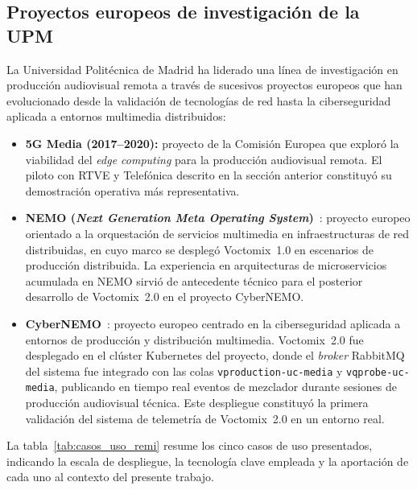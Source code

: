\subsection{Proyectos europeos de investigación de la UPM}

La Universidad Politécnica de Madrid ha liderado una línea de investigación en
producción audiovisual remota a través de sucesivos proyectos europeos que han
evolucionado desde la validación de tecnologías de red hasta la ciberseguridad
aplicada a entornos multimedia distribuidos:

\begin{itemize}
  \item \textbf{5G Media (2017--2020):} proyecto de la Comisión Europea que exploró
        la viabilidad del \textit{edge computing} para la producción audiovisual
        remota. El piloto con RTVE y Telefónica descrito en la sección anterior
        constituyó su demostración operativa más representativa.

  \item \textbf{NEMO (\textit{Next Generation Meta Operating System})}~\cite{nemo_cordis}: proyecto
        europeo orientado a la orquestación de servicios multimedia en infraestructuras de
        red distribuidas, en cuyo marco se desplegó Voctomix~1.0 en escenarios de
        producción distribuida. La experiencia en arquitecturas de microservicios
        acumulada en NEMO sirvió de antecedente técnico para el posterior desarrollo
        de Voctomix~2.0 en el proyecto CyberNEMO.

  \item \textbf{CyberNEMO}~\cite{cybernemo_cordis}: proyecto europeo centrado en la ciberseguridad aplicada
        a entornos de producción y distribución multimedia. Voctomix~2.0 fue
        desplegado en el clúster Kubernetes del proyecto, donde el \textit{broker} RabbitMQ
        del sistema fue integrado con las colas
        \texttt{vproduction-uc-media} y \texttt{vqprobe-uc-media}, publicando en
        tiempo real eventos de mezclador durante sesiones de producción audiovisual
        técnica. Este despliegue constituyó la primera validación del sistema de
        telemetría de Voctomix~2.0 en un entorno real.
\end{itemize}

La tabla~\ref{tab:casos_uso_remi} resume los cinco casos de uso presentados, indicando
la escala de despliegue, la tecnología clave empleada y la aportación de cada uno al
contexto del presente trabajo.

